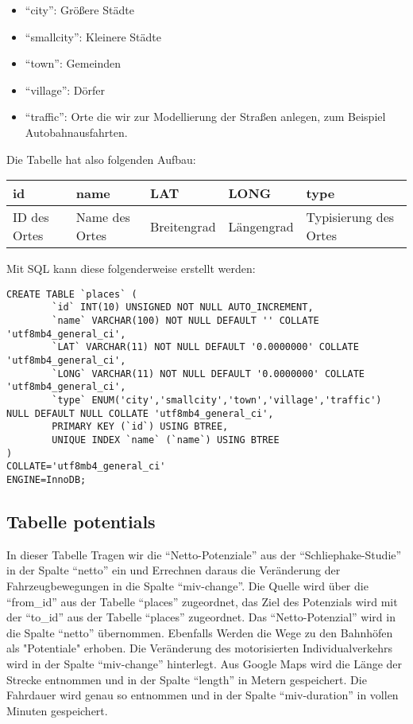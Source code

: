 \documentclass[fontsize=12pt,a4paper]{scrreprt}
\begin{document}
\begin{itemize}
    \item \enquote{city}: Größere Städte
    \item \enquote{smallcity}: Kleinere Städte
    \item \enquote{town}: Gemeinden
    \item \enquote{village}: Dörfer
    \item \enquote{traffic}: Orte die wir zur Modellierung der Straßen anlegen, zum Beispiel Autobahnausfahrten.
\end{itemize}

Die Tabelle hat also folgenden Aufbau:
\newline
\newline
\begin{tabular}[h]{|l|l|l|l|l|}
        \hline
        id & name & LAT & LONG & type\\
        \hline
        ID des Ortes & Name des Ortes & Breitengrad & Längengrad & Typisierung des Ortes \\
        \hline
\end{tabular}
\newline
\newline
\newline
Mit SQL kann diese folgenderweise erstellt werden:
\begin{verbatim}
CREATE TABLE `places` (
        `id` INT(10) UNSIGNED NOT NULL AUTO_INCREMENT,
        `name` VARCHAR(100) NOT NULL DEFAULT '' COLLATE 'utf8mb4_general_ci',
        `LAT` VARCHAR(11) NOT NULL DEFAULT '0.0000000' COLLATE 'utf8mb4_general_ci',
        `LONG` VARCHAR(11) NOT NULL DEFAULT '0.0000000' COLLATE 'utf8mb4_general_ci',
        `type` ENUM('city','smallcity','town','village','traffic') NULL DEFAULT NULL COLLATE 'utf8mb4_general_ci',
        PRIMARY KEY (`id`) USING BTREE,
        UNIQUE INDEX `name` (`name`) USING BTREE
)
COLLATE='utf8mb4_general_ci'
ENGINE=InnoDB;
\end{verbatim}

\subsection{Tabelle potentials}

In dieser Tabelle Tragen wir die \enquote{Netto-Potenziale} aus der \enquote{Schliephake-Studie} in der Spalte \enquote{netto} ein und Errechnen daraus die Veränderung der Fahrzeugbewegungen in die Spalte \enquote{miv-change}. Die Quelle wird über die \enquote{from_id} aus der Tabelle \enquote{places} zugeordnet, das Ziel des Potenzials wird mit der \enquote{to_id} aus der Tabelle \enquote{places} zugeordnet. Das \enquote{Netto-Potenzial} wird in die Spalte \enquote{netto} übernommen. Ebenfalls Werden die Wege zu den Bahnhöfen als "Potentiale" erhoben. Die Veränderung des motorisierten Individualverkehrs wird in der Spalte \enquote{miv-change} hinterlegt. Aus Google Maps wird die Länge der Strecke entnommen und in der Spalte \enquote{length} in Metern gespeichert. Die Fahrdauer wird genau so entnommen und in der Spalte \enquote{miv-duration} in vollen Minuten gespeichert.
\end{document}

